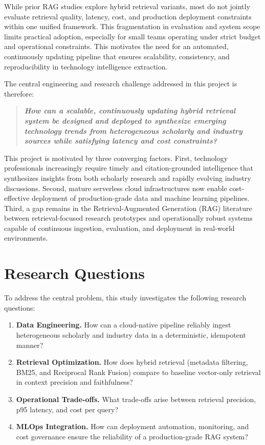 While prior RAG studies explore hybrid retrieval variants, most do not jointly evaluate retrieval quality, latency, cost, and production deployment constraints within one unified framework. This fragmentation in evaluation and system scope limits practical adoption, especially for small teams operating under strict budget and operational constraints. This motivates the need for an automated, continuously updating pipeline that ensures scalability, consistency, and reproducibility in technology intelligence extraction.

The central engineering and research challenge addressed in this project is therefore:

\begin{quote}
\textbf{\textit{How can a scalable, continuously updating hybrid retrieval system be designed and deployed to synthesize emerging technology trends from heterogeneous scholarly and industry sources while satisfying latency and cost constraints?}}
\end{quote}

This project is motivated by three converging factors. First, technology professionals increasingly require timely and citation-grounded intelligence that synthesizes insights from both scholarly research and rapidly evolving industry discussions. Second, mature serverless cloud infrastructures now enable cost-effective deployment of production-grade data and machine learning pipelines. Third, a gap remains in the Retrieval-Augmented Generation (RAG) literature between retrieval-focused research prototypes and operationally robust systems capable of continuous ingestion, evaluation, and deployment in real-world environments.

\section{Research Questions}
\label{sec:rq}

To address the central problem, this study investigates the following research questions:

\begin{enumerate}[leftmargin=0.5in]
  \item \textbf{Data Engineering.} How can a cloud-native pipeline reliably ingest heterogeneous scholarly and industry data in a deterministic, idempotent manner?

  \item \textbf{Retrieval Optimization.} How does hybrid retrieval (metadata filtering, BM25, and Reciprocal Rank Fusion) compare to baseline vector-only retrieval in context precision and faithfulness?

  \item \textbf{Operational Trade-offs.} What trade-offs arise between retrieval precision, p95 latency, and cost per query?

  \item \textbf{MLOps Integration.} How can deployment automation, monitoring, and cost governance ensure the reliability of a production-grade RAG system?
\end{enumerate}

